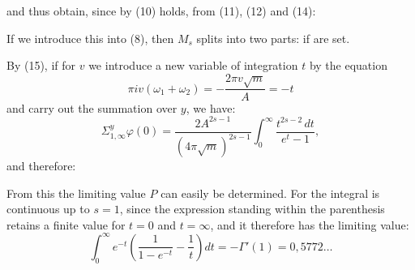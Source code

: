 and thus obtain, since by (10)
holds, from (11), (12) and (14):

If we introduce this into (8), then $M_s$ splits into two parts:
if
are set.

By (15), if for $v$ we introduce a new variable of integration
$t$ by the equation
\[ \pi iv(\omega_1+\omega_2) = -\frac{2\pi v\sqrt{m}}{A} = -t \]
and carry out the summation over $y$, we have:
\[ \Sigma_{1,\infty}^{y}\varphi(0) = \frac{2A^{2s-1}}{(4\pi\sqrt{m})^{2s-1}}\int_0^\infty\frac{t^{2s-2}\,dt}{e^t-1}, \]
and therefore:

From this the limiting value $P$ can easily be determined. For
the integral
is continuous up to $s=1$, since the expression standing within the
parenthesis retains a finite value for $t=0$ and $t=\infty$, and it
therefore has the limiting value:
\[ \int_0^\infty e^{-t}\left(\frac{1}{1-e^{-t}}-\frac{1}{t}\right)dt = -\Gamma'(1) = 0{,}5772\ldots \]
